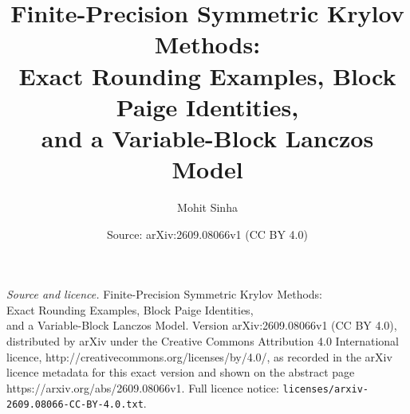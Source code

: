 \documentclass[10pt,a4paper]{amsart}
\title{Finite-Precision Symmetric Krylov Methods:\\ Exact Rounding Examples, Block Paige Identities,\\ and a Variable-Block Lanczos Model}
\author{Mohit Sinha}
\date{Source: arXiv:2609.08066v1 (CC BY 4.0)}
\begin{document}
\maketitle

\noindent\emph{Source and licence.} Finite-Precision Symmetric Krylov Methods:\\ Exact Rounding Examples, Block Paige Identities,\\ and a Variable-Block Lanczos Model. Version arXiv:2609.08066v1 (CC BY 4.0), distributed by arXiv under the Creative Commons Attribution 4.0 International licence, http://creativecommons.org/licenses/by/4.0/, as recorded in the arXiv licence metadata for this exact version and shown on the abstract page https://arxiv.org/abs/2609.08066v1. Full licence notice: \texttt{licenses/arxiv-2609.08066-CC-BY-4.0.txt}.\par\smallskip
\end{document}
